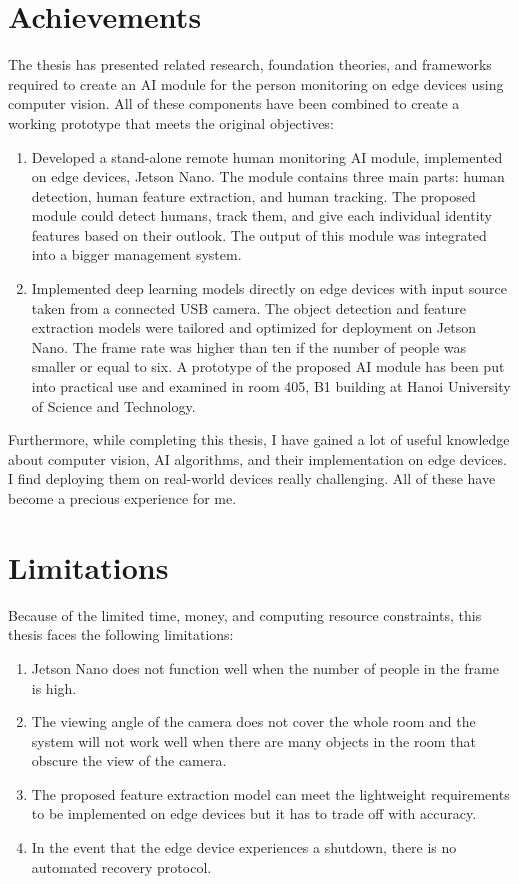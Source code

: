 \documentclass[../main.tex]{subfiles}
\begin{document}
\section{Achievements}
The thesis has presented related research, foundation theories, and frameworks required to create an AI module for the person monitoring on edge devices using computer vision. All of these components have been combined to create a working prototype that meets the original objectives:
\begin{enumerate}
\item Developed a stand-alone remote human monitoring AI module, implemented on edge devices, Jetson Nano. The module contains three main parts: human detection, human feature extraction, and human tracking. The proposed module could detect humans, track them, and give each individual identity features based on their outlook. The output of this module was integrated into a bigger management system.
\item Implemented deep learning models directly on edge devices with input source taken from a connected USB camera. The object detection and feature extraction models were tailored and optimized for deployment on Jetson Nano. The frame rate was higher than ten if the number of people was smaller or equal to six. A prototype of the proposed AI module has been put into practical use and examined in room 405, B1 building at Hanoi University of Science and Technology.
\end{enumerate}

Furthermore, while completing this thesis, I have gained a lot of useful knowledge about computer vision, AI algorithms, and their implementation on edge devices. I find deploying them on real-world devices really challenging. All of these have become a precious experience for me.

\section{Limitations}
Because of the limited time, money, and computing resource constraints, this thesis faces the following limitations:

\begin{enumerate}
\item Jetson Nano does not function well when the number of people in the frame is high.
\item The viewing angle of the camera does not cover the whole room and the system will not work well when there are many objects in the room that obscure the view of the camera.
\item The proposed feature extraction model can meet the lightweight requirements to be implemented on edge devices but it has to trade off with accuracy.
\item In the event that the edge device experiences a shutdown, there is no automated recovery protocol.
\end{enumerate}
\end{document}
